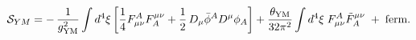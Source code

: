 \begin{equation}
{\cal S}_{YM} = -\,\frac{1}{g_{\rm YM}^2} \int d^4 \xi  \left[
\frac{1}{4} F^A_{\mu\nu} F_A^{\mu\nu} + \frac{1}{2}\, D_{\mu} \bar
\phi^A D^{\mu} \phi_A  \right]  + \frac{\theta_{\rm YM}}{32 \pi^2}
\int d^4 \xi\; F^A_{\mu\nu} {\tilde{F}}_A^{\mu\nu} \; + \; \mbox{ferm.}
\label{ymfn2}
\end{equation} 
